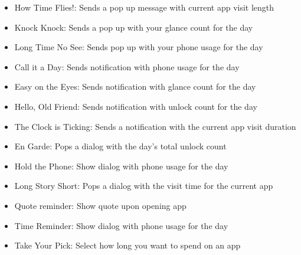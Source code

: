 \begin{small}
\begin{itemize}
    \item How Time Flies!: Sends a pop up message with current app visit length
    \item Knock Knock: Sends a pop up with your glance count for the day
    \item Long Time No See: Sends pop up with your phone usage for the day
    \item Call it a Day: Sends notification with phone usage for the day
    \item Easy on the Eyes: Sends notification with glance count for the day
    \item Hello, Old Friend: Sends notification with unlock count for the day
    \item The Clock is Ticking: Sends a notification with the current app visit duration
    \item En Garde: Pops a dialog with the day's total unlock count
    \item Hold the Phone: Show dialog with phone usage for the day
    \item Long Story Short: Pops a dialog with the visit time for the current app
    \item Quote reminder: Show quote upon opening app
    \item Time Reminder: Show dialog with phone usage for the day
    \item Take Your Pick: Select how long you want to spend on an app
\end{itemize}
\end{small}